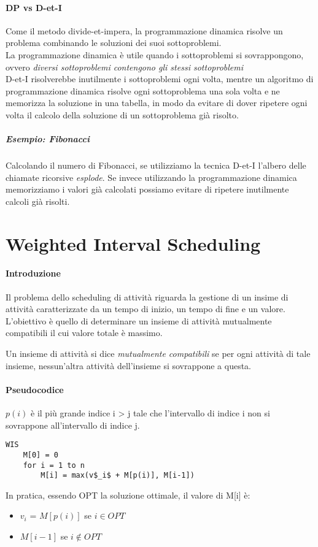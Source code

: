 \documentclass[12pt, a4paper, openany]{book}
\begin{document}
\paragraph{DP vs D-et-I}
Come il metodo divide-et-impera, la programmazione dinamica risolve un problema combinando le soluzioni dei suoi sottoproblemi.\\
La programmazione dinamica è utile quando i sottoproblemi si sovrappongono, ovvero \emph{diversi sottoproblemi contengono gli stessi sottoproblemi}\\
D-et-I risolverebbe inutilmente i sottoproblemi ogni volta, mentre un algoritmo di programmazione dinamica risolve ogni sottoproblema una sola volta e ne memorizza la soluzione in una tabella, in modo da evitare di dover ripetere ogni volta il calcolo della soluzione di un sottoproblema già risolto.
\subparagraph{Esempio: Fibonacci}
Calcolando il numero di Fibonacci, se utilizziamo la tecnica D-et-I l'albero delle chiamate ricorsive \emph{esplode}.
Se invece utilizzando la programmazione dinamica memorizziamo i valori già calcolati possiamo evitare di ripetere inutilmente calcoli già risolti.

\section{Weighted Interval Scheduling}
\paragraph{Introduzione}Il problema dello scheduling di attività riguarda la gestione di un insime di attività caratterizzate da un tempo di inizio, un tempo di fine e un valore.
L'obiettivo è quello di determinare un insieme di attività mutualmente compatibili il cui valore totale è massimo.

Un insieme di attività si dice\emph{ mutualmente compatibili} se per ogni attività di tale insieme, nessun'altra attività dell'insieme si sovrappone a questa.


\paragraph{Pseudocodice}
$p(i)$ è il più grande indice i > j tale che l'intervallo di indice i non si sovrappone all'intervallo di indice j.
\begin{lstlisting}
WIS
	M[0] = 0
	for i = 1 to n
		M[i] = max(v$_i$ + M[p(i)], M[i-1])
\end{lstlisting}
In pratica, essendo OPT la soluzione ottimale, il valore di M[i] è:
\begin{itemize}
	\item $v_i$ = $M[p(i)]$ se $i \in OPT$
	\item $M[i-1]$ se $i \notin OPT$
\end{itemize}
\end{document}
